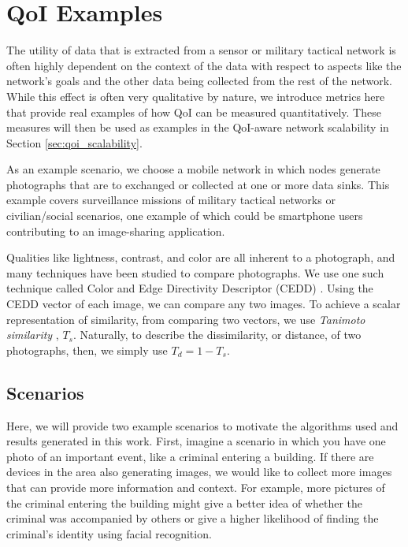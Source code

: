 
\section{QoI Examples}
\label{sec:qoi_examples}

The utility of data that is extracted from a sensor or military tactical network is often highly dependent on the context of the data with respect to aspects like the network's goals and the other data being collected from the rest of the network.  While this effect is often very qualitative by nature, we introduce metrics here that provide real examples of how QoI can be measured quantitatively.  These measures will then be used as examples in the QoI-aware network scalability in Section \ref{sec:qoi_scalability}.  

As an example scenario, we choose a mobile network in which nodes generate photographs that are to exchanged or collected at one or more data sinks.  This example covers surveillance missions of military tactical networks or civilian/social scenarios, one example of which could be smartphone users contributing to an image-sharing application.  

Qualities like lightness, contrast, and color are all inherent to a photograph, and many techniques have been studied to compare photographs.  We use one such technique called Color and Edge Directivity Descriptor (CEDD) \cite{2008cedd}.  Using the CEDD vector of each image, we can compare any two images.  To achieve a scalar representation of similarity, from comparing two vectors, we use \emph{Tanimoto similarity} \cite{tanimoto}, $T_s$.  Naturally, to describe the dissimilarity, or distance, of two photographs, then, we simply use $T_d = 1 - T_s$.

\subsection{Scenarios}

Here, we will provide two example scenarios to motivate the algorithms used and results generated in this work.  First, imagine a scenario in which you have one photo of an important event, like a criminal entering a building.  If there are devices in the area also generating images, we would like to collect more images that can provide more information and context.  For example, more pictures of the criminal entering the building might give a better idea of whether the criminal was accompanied by others or give a higher likelihood of finding the criminal's identity using facial recognition.  

